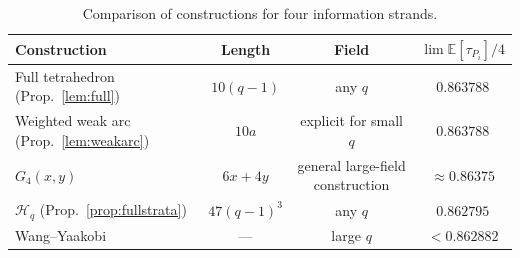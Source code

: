 \documentclass{article}
\newcommand{\E}{\mathbb{E}}
\begin{document}
{\begin{table}[H]
\centering
\caption{Comparison of constructions for four information strands.}
\label{tab:k4-comparison}
\begin{tabular}{@{}lccc@{}}
\toprule
Construction & Length & Field & $\displaystyle\lim \E[\tau_{P_i}]/4$\\
\midrule
Full tetrahedron (Prop.~\ref{lem:full})
& $10(q-1)$ & any $q$ & $0.863788$\\
Weighted weak arc (Prop.~\ref{lem:weakarc})
& $10a$ & explicit for small $q$ & $0.863788$\\
$G_4(x,y)$ \cite{BoruchovskyEtAl2026}
& $6x+4y$ & general large-field construction & $\approx0.86375$\\
$\mathcal H_q$ (Prop.~\ref{prop:fullstrata})
& $47(q-1)^3$ & any $q$ & ${0.862795}$\\
Wang--Yaakobi \cite{WangYaakobi2026}
& --- & large $q$ & $<0.862882$\\
\bottomrule
\end{tabular}
\end{table}

}
\end{document}
